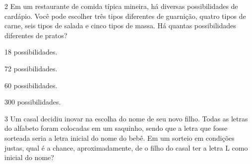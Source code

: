 




\num{2} Em um restaurante de comida típica mineira, há diversas
possibilidades de cardápio. Você pode escolher três tipos diferentes de
guarnição, quatro tipos de carne, seis tipos de salada e cinco tipos de massa.
Há quantas possibilidades diferentes de pratos?

\begin{escolha}[itemsep=0pt]
\item 18 possibilidades.
\item 72 possibilidades.
\item 60 possibilidades.
\item 300 possibilidades.
\end{escolha}









\num{3} Um casal decidiu inovar na escolha do nome de seu novo filho. Todas
as letras do alfabeto foram colocadas em um saquinho, sendo que a letra
que fosse sorteada seria a letra inicial do nome do bebê. Em um sorteio
em condições justas, qual é a chance, aproximadamente, de o filho do casal
ter a letra L como inicial do nome?

